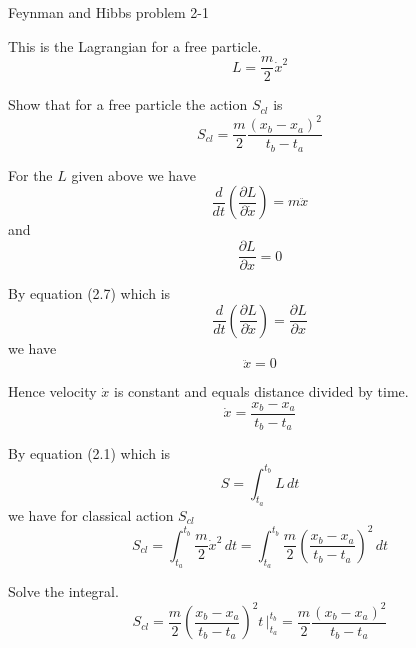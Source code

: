 \documentclass[12pt]{article}
\begin{document}
\noindent
Feynman and Hibbs problem 2-1

\bigskip
This is the Lagrangian for a free particle.
\begin{equation*}
L=\frac{m}{2}\dot x^2
\end{equation*}

Show that for a free particle the action $S_{cl}$ is
\begin{equation*}
S_{cl}=\frac{m}{2}\frac{(x_b-x_a)^2}{t_b-t_a}
\end{equation*}

For the $L$ given above we have
\begin{equation*}
\frac{d}{dt}\left(\frac{\partial L}{\partial\dot x}\right)=m\ddot x
\end{equation*}
and
\begin{equation*}
\frac{\partial L}{\partial x}=0
\end{equation*}

By equation (2.7) which is
\begin{equation*}
\frac{d}{dt}\left(\frac{\partial L}{\partial\dot x}\right)=\frac{\partial L}{\partial x}
\end{equation*}
we have
\begin{equation*}
\ddot x=0
\end{equation*}

Hence velocity $\dot x$ is constant and equals distance divided by time.
\begin{equation*}
\dot x=\frac{x_b-x_a}{t_b-t_a}
\end{equation*}

By equation (2.1) which is
\begin{equation*}
S=\int_{t_a}^{t_b} L\,dt
\end{equation*}
we have for classical action $S_{cl}$
\begin{equation*}
S_{cl}=\int_{t_a}^{t_b}\frac{m}{2}\dot x^2\,dt=\int_{t_a}^{t_b}\frac{m}{2}\left(\frac{x_b-x_a}{t_b-t_a}\right)^2\,dt
\end{equation*}

Solve the integral.
\begin{equation*}
S_{cl}
=\frac{m}{2}\left(\frac{x_b-x_a}{t_b-t_a}\right)^2 t\,\bigg|_{t_a}^{t_b}
=\frac{m}{2}\frac{(x_b-x_a)^2}{t_b-t_a}
\end{equation*}
\end{document}
